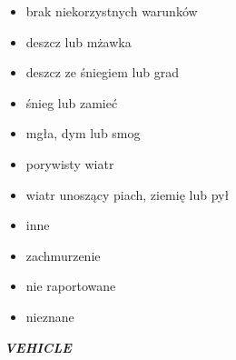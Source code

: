 \begin{itemize}
  \begin{itemize}
  \itemsep-14pt\parskip0pt
  \item
    brak niekorzystnych warunków\\
  \item
    deszcz lub mżawka\\
  \item
    deszcz ze śniegiem lub grad\\
  \item
    śnieg lub zamieć\\
  \item
    mgła, dym lub smog\\
  \item
    porywisty wiatr\\
  \item
    wiatr unoszący piach, ziemię lub pył\\
  \item
    inne\\
  \item
    zachmurzenie\\
  \item
    nie raportowane\\
  \item
    nieznane
  \end{itemize}
\end{itemize}

\emph{\textbf{VEHICLE}}

